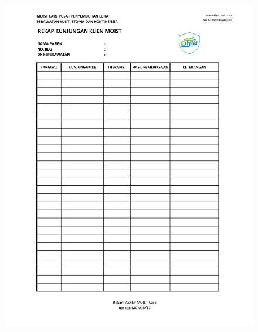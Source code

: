 \begin{figure}[H]
	\centering
	\includegraphics[keepaspectratio, width=14cm]{gambar/Format_Pengkajian-1}
	\label{gambar:Format_Pengkajian_1}
\end{figure}

